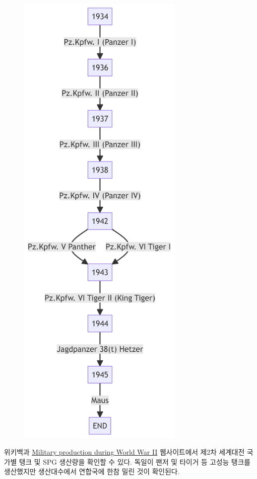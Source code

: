 \documentclass[
  letterpaper,
  chapter,a4paper,showtrims,openright,hidelinks]{oblivoir}
\begin{document}
\begin{figure}[H]

{\centering \includegraphics[width=3.17in,height=9.1in]{cs_german_tank_files/figure-latex/mermaid-figure-1.png}

}

\end{figure}

위키백과
\href{https://en.wikipedia.org/wiki/Military_production_during_World_War_II}{Military
production during World War II} 웹사이트에서 제2차 세계대전 국가별 탱크
및 SPG 생산량을 확인할 수 있다. 독일이 팬저 및 타이거 등 고성능 탱크를
생산했지만 생산대수에서 연합국에 한참 밀린 것이 확인된다.
\end{document}
